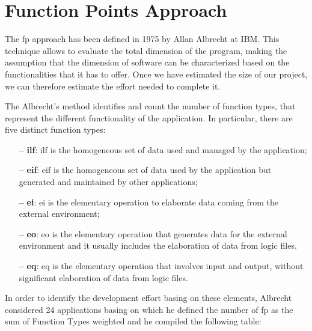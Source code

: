\section{Function Points Approach} \label{sec:functpointappr}


The \acl{fp} approach has been defined in 1975 by Allan Albrecht at IBM. This technique allows to evaluate the total dimension of the program, making the assumption that the dimension of software can be characterized based on the functionalities that it has to offer.
Once we have estimated the size of our project, we can therefore estimate the effort needed to complete it.
\newline

The Albrecht's method identifies and count the number of function types, that represent the different functionality of the application.
In particular, there are five distinct function types:

\begin{itemize}

\item[\textbf{--}] \textbf{\acl{ilf}}: \acs{ilf} is the homogeneous set of data used and managed by the application;

\item[\textbf{--}] \textbf{\acl{eif}}: \acs{eif} is the homogeneous set of data used by the application but generated and maintained by other applications;

\item[\textbf{--}] \textbf{\acl{ei}}: \acs{ei} is the elementary operation to elaborate data coming from the external environment;

\item[\textbf{--}] \textbf{\acl{eo}}: \acs{eo} is the elementary operation that generates data for the external environment and it usually includes the elaboration of data from logic files.

\item[\textbf{--}] \textbf{\acl{eq}}: \acs{eq} is the elementary operation that involves input and output, without significant elaboration of data from logic files.

\end{itemize}

In order to identify the development effort basing on these elements, Albrecht considered 24 applications basing on which he defined the number of \acs{fp} as the sum of Function Types weighted and he compiled the following table:

